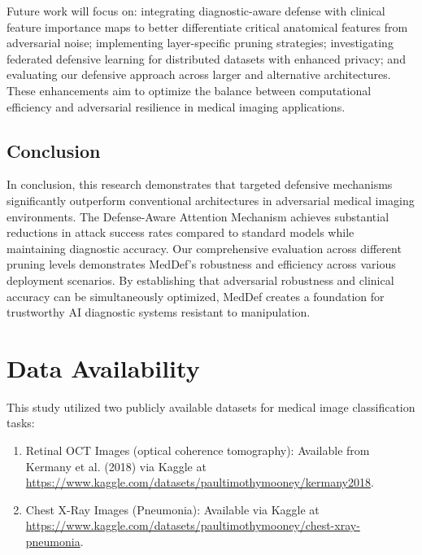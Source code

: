 \documentclass[preprint,12pt]{elsarticle}
\begin{document}
Future work will focus on: integrating diagnostic-aware defense with clinical feature importance maps to better differentiate critical anatomical features from adversarial noise; implementing layer-specific pruning strategies; investigating federated defensive learning for distributed datasets with enhanced privacy; and evaluating our defensive approach across larger and alternative architectures. These enhancements aim to optimize the balance between computational efficiency and adversarial resilience in medical imaging applications.

\subsection{Conclusion}
In conclusion, this research demonstrates that targeted defensive mechanisms significantly outperform conventional architectures in adversarial medical imaging environments. The Defense-Aware Attention Mechanism achieves substantial reductions in attack success rates compared to standard models while maintaining diagnostic accuracy. Our comprehensive evaluation across different pruning levels demonstrates MedDef's robustness and efficiency across various deployment scenarios. By establishing that adversarial robustness and clinical accuracy can be simultaneously optimized, MedDef creates a foundation for trustworthy AI diagnostic systems resistant to manipulation.


\section*{Data Availability}
This study utilized two publicly available datasets for medical image classification tasks:
\begin{enumerate}
\item Retinal OCT Images (optical coherence tomography): Available from Kermany et al. (2018) via Kaggle at \\
\url{https://www.kaggle.com/datasets/paultimothymooney/kermany2018}.
\item Chest X-Ray Images (Pneumonia): Available via Kaggle at \\
\url{https://www.kaggle.com/datasets/paultimothymooney/chest-xray-pneumonia}.
\end{enumerate}



 


\end{document}
